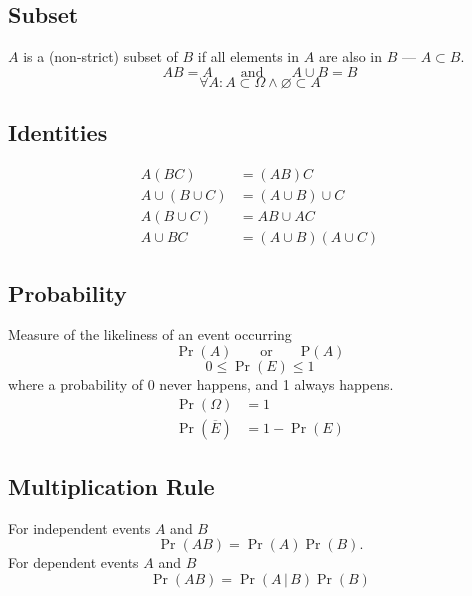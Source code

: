 \documentclass{article}
\begin{document}
\begin{multicols}{3}
    \subsection{Subset}
    \(A\) is a (non-strict) subset of \(B\) if all elements in \(A\) are also in \(B\) --- \(A \subset B\).
    \begin{equation*}
        AB = A \quad\quad \text{and} \quad\quad A \cup B = B
    \end{equation*}
    \begin{equation*}
        \forall A:A\subset \Omega \land \varnothing \subset A
    \end{equation*}
    \subsection{Identities}
    \begin{align*}
        A \left( BC \right)            & = \left( AB \right) C                             \\
        A \cup \left( B \cup C \right) & = \left( A \cup B \right) \cup C                  \\
        A \left(B \cup C\right)        & = AB \cup AC                                      \\
        A \cup BC                      & = \left( A \cup B \right) \left( A \cup C \right)
    \end{align*}
    \subsection{Probability}
    Measure of the likeliness of an event occurring
    \begin{equation*}
        \Pr{\left( A \right)} \quad\quad \text{or} \quad\quad \mathrm{P}\left( A \right)
    \end{equation*}
    \begin{equation*}
        0 \leq \Pr{\left( E \right)} \leq 1
    \end{equation*}
    where a probability of 0 never happens, and 1 always happens.
    \begin{align*}
        \Pr{\left( \Omega \right)}       & = 1                         \\
        \Pr{\left( \overline{E} \right)} & = 1 - \Pr{\left( E \right)}
    \end{align*}
    \subsection{Multiplication Rule}
    For independent events \(A\) and \(B\)
    \begin{equation*}
        \Pr{\left( AB \right)} = \Pr{\left( A \right)} \Pr{\left( B \right)}.
    \end{equation*}
    For dependent events \(A\) and \(B\)
    \begin{equation*}
        \Pr{\left( AB \right)} = \Pr{\left( A \,\vert\, B \right)} \Pr{\left( B \right)}
    \end{equation*}

\end{multicols}
\end{document}

